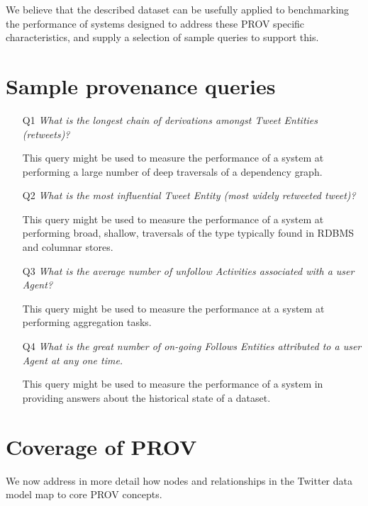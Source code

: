 \documentclass{llncs}
\begin{document}
%
We believe that the described dataset can be usefully applied to benchmarking the performance of systems designed to address these PROV specific characteristics, and supply a selection of sample queries to support this.
%
\section{Sample provenance queries}
%
\begin{enumerate}
    \item[Q1] \textit{What is the longest chain of derivations amongst Tweet Entities (retweets)?}
    
    This query might be used to measure the performance of a system at performing a large number of deep traversals of a dependency graph. 
    
    \item[Q2] \textit{What is the most influential Tweet Entity (most widely retweeted tweet)?}
    
    This query might be used to measure the performance of a system at performing broad, shallow, traversals of the type typically found in RDBMS and columnar stores.
     
    \item[Q3] \textit{What is the average number of unfollow Activities associated with a user Agent?}
    
    This query might be used to measure the performance at a system at performing aggregation tasks.
     
    \item[Q4] \textit{What is the great number of on-going Follows Entities attributed to a user Agent at any one time.}
    
    This query might be used to measure the performance of a system in providing answers about the historical state of a dataset.
    
\end{enumerate}
%
\section{Coverage of PROV}
%
We now address in more detail how nodes and relationships in the Twitter data model map to core PROV concepts.
%
\end{document}
